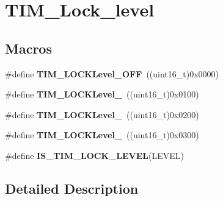 \hypertarget{group___t_i_m___lock__level}{\section{T\-I\-M\-\_\-\-Lock\-\_\-level}
\label{group___t_i_m___lock__level}
}
\subsection*{Macros}
\begin{DoxyCompactItemize}
\item 
\hypertarget{group___t_i_m___lock__level_ga84d318c62d3e5dfe7082610d03e11f2f}{\#define {\bfseries T\-I\-M\-\_\-\-L\-O\-C\-K\-Level\-\_\-\-O\-F\-F}~((uint16\-\_\-t)0x0000)}\label{group___t_i_m___lock__level_ga84d318c62d3e5dfe7082610d03e11f2f}

\item 
\hypertarget{group___t_i_m___lock__level_ga7e4326fc7756ebf5e9eb9776c2734aea}{\#define {\bfseries T\-I\-M\-\_\-\-L\-O\-C\-K\-Level\-\_}~((uint16\-\_\-t)0x0100)}\label{group___t_i_m___lock__level_ga7e4326fc7756ebf5e9eb9776c2734aea}

\item 
\hypertarget{group___t_i_m___lock__level_ga91bdf218f766e6a10b7a7df407250d25}{\#define {\bfseries T\-I\-M\-\_\-\-L\-O\-C\-K\-Level\-\_}~((uint16\-\_\-t)0x0200)}\label{group___t_i_m___lock__level_ga91bdf218f766e6a10b7a7df407250d25}

\item 
\hypertarget{group___t_i_m___lock__level_gaa0a0c1ffd9dc582d6571780c1747920b}{\#define {\bfseries T\-I\-M\-\_\-\-L\-O\-C\-K\-Level\-\_}~((uint16\-\_\-t)0x0300)}\label{group___t_i_m___lock__level_gaa0a0c1ffd9dc582d6571780c1747920b}

\item 
\#define {\bfseries I\-S\-\_\-\-T\-I\-M\-\_\-\-L\-O\-C\-K\-\_\-\-L\-E\-V\-E\-L}(L\-E\-V\-E\-L)
\end{DoxyCompactItemize}


\subsection{Detailed Description}


